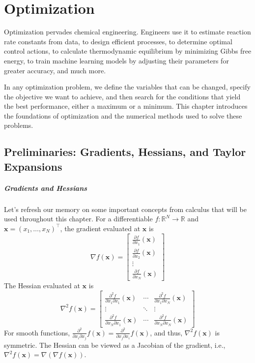 \chapter{Optimization}

Optimization pervades chemical engineering. Engineers use it to estimate reaction rate constants from data, to design efficient processes, to determine optimal control actions, to calculate thermodynamic equilibrium by minimizing Gibbs free energy, to train machine learning models by adjusting their parameters for greater accuracy, and much more.

In any optimization problem, we define the variables that can be changed, specify the objective we want to achieve, and then search for the conditions that yield the best performance, either a maximum or a minimum. This chapter introduces the foundations of optimization and the numerical methods used to solve these problems.

\section{Preliminaries: Gradients, Hessians, and Taylor Expansions}
\paragraph*{Gradients and Hessians}
Let's refresh our memory on some important concepts from calculus that will be used throughout this chapter. For a differentiable $f: \mathbb{R}^N \to \mathbb{R}$ and $\mathbf{x} = (x_1,\dots,x_N)^\top$, the gradient evaluated at $\mathbf{x}$ is
\begin{equation}
    \renewcommand{\arraystretch}{1.5}
    \nabla f(\mathbf{x}) = \begin{bmatrix}
        \frac{\partial f}{\partial x_1}(\mathbf{x}) \\
        \frac{\partial f}{\partial x_2}(\mathbf{x}) \\
        \vdots \\
        \frac{\partial f}{\partial x_N}(\mathbf{x})
    \end{bmatrix}
    \end{equation}
The Hessian evaluated at $\mathbf{x}$ is
\begin{equation}
    \renewcommand{\arraystretch}{1.5}
    \nabla^2 f(\mathbf{x}) = \begin{bmatrix}
        \frac{\partial^2 f}{\partial x_1\partial x_1}(\mathbf{x}) & \cdots & \frac{\partial^2 f}{\partial x_1\partial x_N}(\mathbf{x}) \\
        \vdots & \ddots & \vdots \\
        \frac{\partial^2 f}{\partial x_N\partial x_1}(\mathbf{x}) & \cdots & \frac{\partial^2 f}{\partial x_N\partial x_N}(\mathbf{x})
    \end{bmatrix}
\end{equation}
For smooth functions, $\frac{\partial^2}{\partial x_i\partial x_j}f (\mathbf{x}) = \frac{\partial^2}{\partial x_j\partial x_i}f(\mathbf{x})$, and thus, $\nabla^2 f(\mathbf{x})$ is symmetric. The Hessian can be viewed as a Jacobian of the gradient, i.e., $\nabla^2 f(\mathbf{x}) = \nabla(\nabla f(\mathbf{x}))$.

